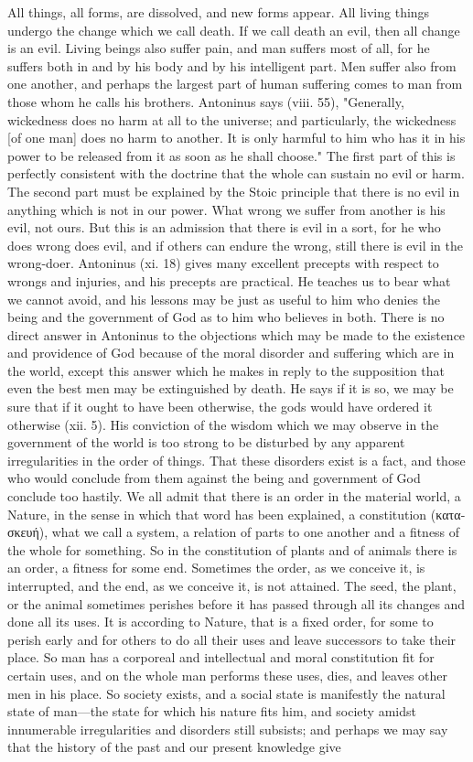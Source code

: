 All things, all forms, are dissolved, and new forms appear. All living things undergo the change which we call death. If we call death an evil, then all change is an evil. Living beings also suffer pain, and man suffers most of all, for he suffers both in and by his body and by his intelligent part. Men suffer also from one another, and perhaps the largest part of human suffering comes to man from those whom he calls his brothers. Antoninus says (viii. 55), "Generally, wickedness does no harm at all to the universe; and particularly, the wickedness [of one man] does no harm to another. It is only harmful to him who has it in his power to be released from it as soon as he shall choose." The first part of this is perfectly consistent with the doctrine that the whole can sustain no evil or harm. The second part must be explained by the Stoic principle that there is no evil in anything which is not in our power. What wrong we suffer from another is his evil, not ours. But this is an admission that there is evil in a sort, for he who does wrong does evil, and if others can endure the wrong, still there is evil in the wrong-doer. Antoninus (xi. 18) gives many excellent precepts with respect to wrongs and injuries, and his precepts are practical. He teaches us to bear what we cannot avoid, and his lessons may be just as useful to him who denies the being and the government of God as to him who believes in both. There is no direct answer in Antoninus to the objections which may be made to the existence and providence of God because of the moral disorder and suffering which are in the world, except this answer which he makes in reply to the supposition that even the best men may be extinguished by death. He says if it is so, we may be sure that if it ought to have been otherwise, the gods would have ordered it otherwise (xii. 5). His conviction of the wisdom which we may observe in the government of the world is too strong to be disturbed by any apparent irregularities in the order of things. That these disorders exist is a fact, and those who would conclude from them against the being and government of God conclude too hastily. We all admit that there is an order in the material world, a Nature, in the sense in which that word has been explained, a constitution (\textgreek{κατασκευή}), what we call a system, a relation of parts to one another and a fitness of the whole for something. So in the constitution of plants and of animals there is an order, a fitness for some end. Sometimes the order, as we conceive it, is interrupted, and the end, as we conceive it, is not attained. The seed, the plant, or the animal sometimes perishes before it has passed through all its changes and done all its uses. It is according to Nature, that is a fixed order, for some to perish early and for others to do all their uses and leave successors to take their place. So man has a corporeal and intellectual and moral constitution fit for certain uses, and on the whole man performs these uses, dies, and leaves other men in his place. So society exists, and a social state is manifestly the natural state of man—the state for which his nature fits him, and society amidst innumerable irregularities and disorders still subsists; and perhaps we may say that the history of the past and our present knowledge give 